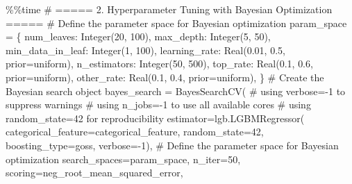 \documentclass[
  letterpaper,
  DIV=11,
  numbers=noendperiod]{scrreprt}
\newenvironment{Shaded}{\begin{snugshade}}{\end{snugshade}}
\newcommand{\CommentTok}[1]{\textcolor[rgb]{0.37,0.37,0.37}{#1}}
\newcommand{\DecValTok}[1]{\textcolor[rgb]{0.68,0.00,0.00}{#1}}
\newcommand{\FloatTok}[1]{\textcolor[rgb]{0.68,0.00,0.00}{#1}}
\newcommand{\NormalTok}[1]{\textcolor[rgb]{0.00,0.23,0.31}{#1}}
\newcommand{\OperatorTok}[1]{\textcolor[rgb]{0.37,0.37,0.37}{#1}}
\newcommand{\StringTok}[1]{\textcolor[rgb]{0.13,0.47,0.30}{#1}}
\begin{document}
\begin{Shaded}
\begin{Highlighting}[]
\OperatorTok{\%\%}\NormalTok{time}
\CommentTok{\# ===== 2. Hyperparameter Tuning with Bayesian Optimization =====}
\CommentTok{\# Define the parameter space for Bayesian optimization}
\NormalTok{param\_space }\OperatorTok{=}\NormalTok{ \{}
    \StringTok{\textquotesingle{}num\_leaves\textquotesingle{}}\NormalTok{: Integer(}\DecValTok{20}\NormalTok{, }\DecValTok{100}\NormalTok{),}
    \StringTok{\textquotesingle{}max\_depth\textquotesingle{}}\NormalTok{: Integer(}\DecValTok{5}\NormalTok{, }\DecValTok{50}\NormalTok{),}
    \StringTok{\textquotesingle{}min\_data\_in\_leaf\textquotesingle{}}\NormalTok{: Integer(}\DecValTok{1}\NormalTok{, }\DecValTok{100}\NormalTok{),}
    \StringTok{\textquotesingle{}learning\_rate\textquotesingle{}}\NormalTok{: Real(}\FloatTok{0.01}\NormalTok{, }\FloatTok{0.5}\NormalTok{, prior}\OperatorTok{=}\StringTok{\textquotesingle{}uniform\textquotesingle{}}\NormalTok{),}
    \StringTok{\textquotesingle{}n\_estimators\textquotesingle{}}\NormalTok{: Integer(}\DecValTok{50}\NormalTok{, }\DecValTok{500}\NormalTok{),}
    \StringTok{\textquotesingle{}top\_rate\textquotesingle{}}\NormalTok{: Real(}\FloatTok{0.1}\NormalTok{, }\FloatTok{0.6}\NormalTok{, prior}\OperatorTok{=}\StringTok{\textquotesingle{}uniform\textquotesingle{}}\NormalTok{),}
    \StringTok{\textquotesingle{}other\_rate\textquotesingle{}}\NormalTok{: Real(}\FloatTok{0.1}\NormalTok{, }\FloatTok{0.4}\NormalTok{, prior}\OperatorTok{=}\StringTok{\textquotesingle{}uniform\textquotesingle{}}\NormalTok{),}
\NormalTok{\}}
\CommentTok{\# Create the Bayesian search object}
\NormalTok{bayes\_search }\OperatorTok{=}\NormalTok{ BayesSearchCV(}
    \CommentTok{\# using verbose={-}1 to suppress warnings}
    \CommentTok{\# using n\_jobs={-}1 to use all available cores}
    \CommentTok{\# using random\_state=42 for reproducibility}
\NormalTok{    estimator}\OperatorTok{=}\NormalTok{lgb.LGBMRegressor( categorical\_feature}\OperatorTok{=}\NormalTok{categorical\_feature, random\_state}\OperatorTok{=}\DecValTok{42}\NormalTok{, boosting\_type}\OperatorTok{=}\StringTok{\textquotesingle{}goss\textquotesingle{}}\NormalTok{, verbose}\OperatorTok{={-}}\DecValTok{1}\NormalTok{),}
    \CommentTok{\# Define the parameter space for Bayesian optimization}
\NormalTok{    search\_spaces}\OperatorTok{=}\NormalTok{param\_space,}
\NormalTok{    n\_iter}\OperatorTok{=}\DecValTok{50}\NormalTok{,}
\NormalTok{    scoring}\OperatorTok{=}\StringTok{\textquotesingle{}neg\_root\_mean\_squared\_error\textquotesingle{}}\NormalTok{,}

\end{Highlighting}
\end{Shaded}
\end{document}
